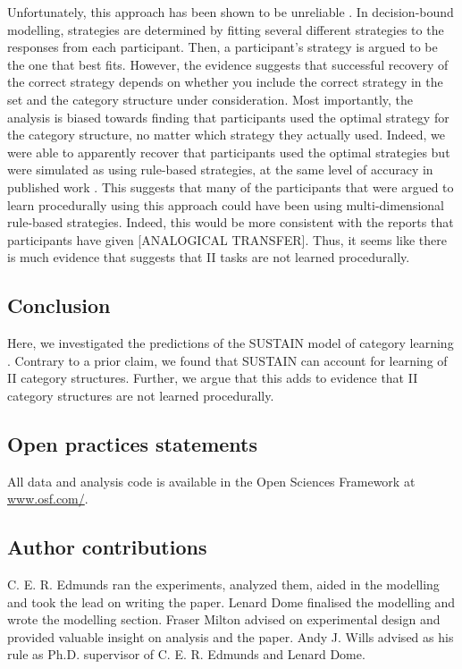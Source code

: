 \documentclass[12pt]{article}
\begin{document}
Unfortunately, this approach has been shown to be unreliable \cite{Donkin2015, Edmunds2018}. 
In decision-bound modelling, strategies are determined by fitting several different strategies to the responses from each participant. 
Then, a participant's strategy is argued to be the one that best fits. 
However, the evidence suggests that successful recovery of the correct strategy depends on whether you include the correct strategy in the set \cite{Donkin2015, Edmunds2018} and the category structure under consideration. 
Most importantly, the analysis is biased towards finding that participants used the optimal strategy for the category structure, no matter which strategy they actually used. 
Indeed, we were able to apparently recover that participants used the optimal strategies but were simulated as using rule-based strategies, at the same level of accuracy in published work \cite{Edmunds2018, Smith2014}.
This suggests that many of the participants that were argued to learn procedurally using this approach could have been using multi-dimensional rule-based strategies. 
Indeed, this would be more consistent with the reports that participants have given \cite{Edmunds2015, Edmunds2017}[ANALOGICAL TRANSFER]. 
Thus, it seems like there is much evidence that suggests that II tasks are not learned procedurally. 

\subsection{Conclusion}
Here, we investigated the predictions of the SUSTAIN model of category learning \cite{Love2004}. 
Contrary to a prior claim, we found that SUSTAIN can account for learning of II category structures. 
Further, we argue that this adds to evidence that II category structures are not learned procedurally. 

\subsection{Open practices statements}
All data and analysis code is available in the Open Sciences Framework at \url{www.osf.com/}. 

\subsection{Author contributions}
C. E. R. Edmunds ran the experiments, analyzed them, aided in the modelling and took the lead on writing the paper. 
Lenard Dome finalised the modelling and wrote the modelling section. 
Fraser Milton advised on experimental design and provided valuable insight on analysis and the paper. 
Andy J. Wills advised as his rule as Ph.D. supervisor of C. E. R. Edmunds and Lenard Dome.  
\end{document}
